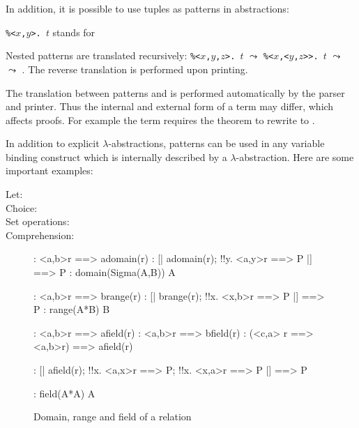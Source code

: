 In addition, it is possible to use tuples as patterns in abstractions:
\begin{center}
{\tt\%<$x$,$y$>. $t$} \quad stands for\quad {}
\end{center}
Nested patterns are translated recursively:
{\tt\%<$x$,$y$,$z$>. $t$} $\leadsto$ {\tt\%<$x$,<$y$,$z$>>. $t$} $\leadsto$
 $\leadsto$ .  The reverse translation is performed upon printing.
\begin{warn}
  The translation between patterns and  is performed automatically
  by the parser and printer.  Thus the internal and external form of a term
  may differ, which affects proofs.  For example the term  requires the theorem  to rewrite to
  {\tt<b,a>}.
\end{warn}
In addition to explicit $\lambda$-abstractions, patterns can be used in any
variable binding construct which is internally described by a
$\lambda$-abstraction.  Here are some important examples:
\begin{description}
\item[Let:] 
\item[Choice:] 
\item[Set operations:] 
\item[Comprehension:] 
\end{description}



\begin{figure}
\begin{alltt*}\isastyleminor
{}:     <a,b>\isasymin{}r ==> a\isasymin{}domain(r)
:     [| a\isasymin{}domain(r); !!y. <a,y>\isasymin{}r ==> P |] ==> P
: domain(Sigma(A,B)) \isasymsubseteq A

:      <a,b>\isasymin{}r ==> b\isasymin{}range(r)
:      [| b\isasymin{}range(r); !!x. <x,b>\isasymin{}r ==> P |] ==> P
: range(A*B) \isasymsubseteq B

:     <a,b>\isasymin{}r ==> a\isasymin{}field(r)
:     <a,b>\isasymin{}r ==> b\isasymin{}field(r)
:     (<c,a> \isasymnotin r ==> <a,b>\isasymin{}r) ==> a\isasymin{}field(r)

:      [| a\isasymin{}field(r); 
                  !!x. <a,x>\isasymin{}r ==> P; 
                  !!x. <x,a>\isasymin{}r ==> P      
               |] ==> P

:  field(A*A) \isasymsubseteq A
\end{alltt*}
\caption{Domain, range and field of a relation} \label{zf-domrange}
\end{figure}

